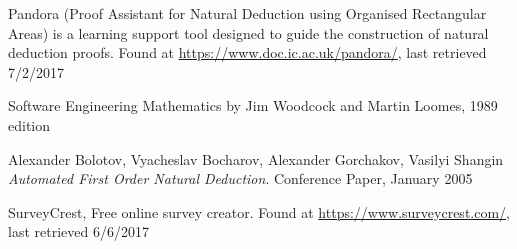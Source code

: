 \begin{thebibliography}{9}

Pandora (Proof Assistant for Natural Deduction using Organised Rectangular Areas) is a learning support tool designed to guide the construction of natural deduction proofs. Found at \url{https://www.doc.ic.ac.uk/pandora/}, last retrieved 7/2/2017

Software Engineering Mathematics by Jim Woodcock and Martin Loomes, 1989 edition

Alexander Bolotov, Vyacheslav Bocharov, Alexander Gorchakov, Vasilyi Shangin \textit{Automated First Order Natural Deduction}. Conference Paper, January 2005

SurveyCrest, Free online survey creator. Found at \url{ https://www.surveycrest.com/}, last retrieved 6/6/2017


\end{thebibliography}





